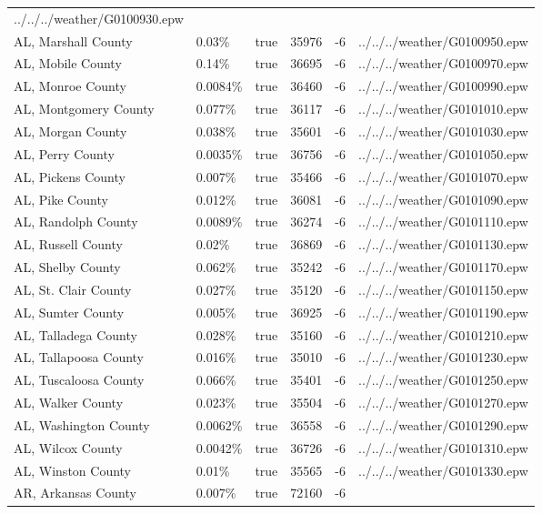 \begin{longtable}[]{@{}llllll@{}}
../../../weather/G0100930.epw \\
AL, Marshall County & 0.03\% & true & 35976 & -6 &
../../../weather/G0100950.epw \\
AL, Mobile County & 0.14\% & true & 36695 & -6 &
../../../weather/G0100970.epw \\
AL, Monroe County & 0.0084\% & true & 36460 & -6 &
../../../weather/G0100990.epw \\
AL, Montgomery County & 0.077\% & true & 36117 & -6 &
../../../weather/G0101010.epw \\
AL, Morgan County & 0.038\% & true & 35601 & -6 &
../../../weather/G0101030.epw \\
AL, Perry County & 0.0035\% & true & 36756 & -6 &
../../../weather/G0101050.epw \\
AL, Pickens County & 0.007\% & true & 35466 & -6 &
../../../weather/G0101070.epw \\
AL, Pike County & 0.012\% & true & 36081 & -6 &
../../../weather/G0101090.epw \\
AL, Randolph County & 0.0089\% & true & 36274 & -6 &
../../../weather/G0101110.epw \\
AL, Russell County & 0.02\% & true & 36869 & -6 &
../../../weather/G0101130.epw \\
AL, Shelby County & 0.062\% & true & 35242 & -6 &
../../../weather/G0101170.epw \\
AL, St. Clair County & 0.027\% & true & 35120 & -6 &
../../../weather/G0101150.epw \\
AL, Sumter County & 0.005\% & true & 36925 & -6 &
../../../weather/G0101190.epw \\
AL, Talladega County & 0.028\% & true & 35160 & -6 &
../../../weather/G0101210.epw \\
AL, Tallapoosa County & 0.016\% & true & 35010 & -6 &
../../../weather/G0101230.epw \\
AL, Tuscaloosa County & 0.066\% & true & 35401 & -6 &
../../../weather/G0101250.epw \\
AL, Walker County & 0.023\% & true & 35504 & -6 &
../../../weather/G0101270.epw \\
AL, Washington County & 0.0062\% & true & 36558 & -6 &
../../../weather/G0101290.epw \\
AL, Wilcox County & 0.0042\% & true & 36726 & -6 &
../../../weather/G0101310.epw \\
AL, Winston County & 0.01\% & true & 35565 & -6 &
../../../weather/G0101330.epw \\
AR, Arkansas County & 0.007\% & true & 72160 & -6 &

\end{longtable}
